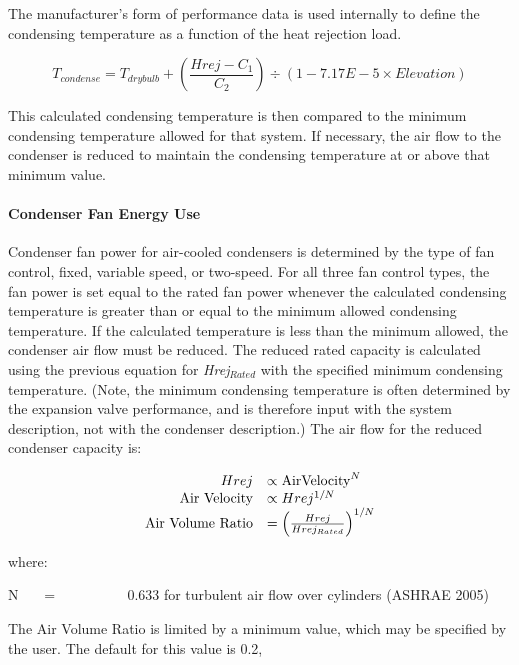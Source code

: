 The manufacturer's form of performance data is used internally to define the condensing temperature as a function of the heat rejection load.

\begin{equation}
{T_{condense}} = {T_{drybulb}} + \left( {\frac{{Hrej - {C_1}}}{{{C_2}}}} \right) \div (1 - 7.17E - 5 \times Elevation)
\end{equation}

This calculated condensing temperature is then compared to the minimum condensing temperature allowed for that system. If necessary, the air flow to the condenser is reduced to maintain the condensing temperature at or above that minimum value.

\paragraph{Condenser Fan Energy Use}\label{condenser-fan-energy-use-1}

Condenser fan power for air-cooled condensers is determined by the type of fan control, fixed, variable speed, or two-speed. For all three fan control types, the fan power is set equal to the rated fan power whenever the calculated condensing temperature is greater than or equal to the minimum allowed condensing temperature. If the calculated temperature is less than the minimum allowed, the condenser air flow must be reduced. The reduced rated capacity is calculated using the previous equation for \emph{Hrej\(_{Rated}\)} with the specified minimum condensing temperature. (Note, the minimum condensing temperature is often determined by the expansion valve performance, and is therefore input with the system description, not with the condenser description.) The air flow for the reduced condenser capacity is:

\begin{equation}
  \begin{array}{rl}
    Hrej &\propto \text{AirVelocity}^N \\
    \text{Air Velocity} &\propto Hrej^{1/N} \\
    \text{Air Volume Ratio} &= \PB{\frac{Hrej}{Hrej_{Rated}}}^{1/N}
  \end{array}
\end{equation}

where:

N~~~ = ~~~~~~~~~ 0.633 for turbulent air flow over cylinders (ASHRAE 2005)

The Air Volume Ratio is limited by a minimum value, which may be specified by the user. The default for this value is 0.2,

